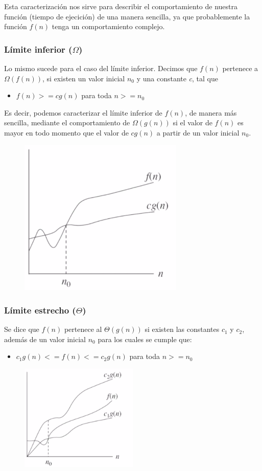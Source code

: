 \documentclass[letterpaper]{article}
\begin{document}
Esta caracterización nos sirve para describir el comportamiento de nuestra
función (tiempo de ejecición) de una manera sencilla, ya que probablemente la
función \(f(n)\) tenga un comportamiento complejo.
\subsubsection{Límite inferior (\(\Omega\))}
\label{sec:org96ab4a1}
Lo mismo sucede para el caso del límite inferior. Decimos que \(f(n)\) pertenece a
\(\Omega(f(n))\), si existen un valor inicial \(n_0\) y una constante \emph{c}, tal que
\begin{itemize}
\item \(f(n) >= c g(n)\) para toda \(n >= n_0\)
\end{itemize}
Es decir, podemos caracterizar el límite inferior de \(f(n)\), de manera más
sencilla, mediante el comportamiento de \(\Omega(g(n))\) si el valor de \(f(n)\) es
mayor en todo momento que el valor de \(c g(n)\) a partir de un valor inicial
\(n_0\).

\begin{figure}
    \includegraphics[width=0.7\textwidth, height=0.4\textwidth]
        {./img/limite_inferior.png}
\end{figure}
\subsubsection{Límite estrecho (\(\Theta\))}
\label{sec:org363f418}
Se dice que \(f(n)\) pertenece al \(\Theta(g(n))\) si existen las constantes \(c_1\) y
\(c_2\), además de un valor inicial \(n_0\) para los cuales se cumple que:
\begin{itemize}
\item \(c_1 g(n) <= f(n) <= c_2 g(n)\) para toda \(n >= n_0\)
\end{itemize}

\begin{figure}
    \includegraphics[width=0.5\textwidth, keepaspectratio]
        {./img/limite_estrecho.png}
\end{figure}
\end{document}
